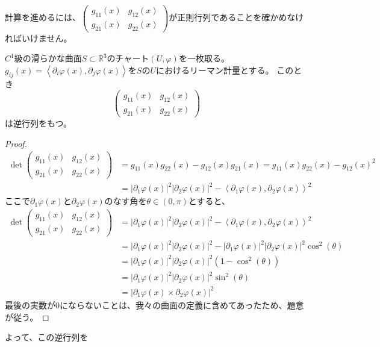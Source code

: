 計算を進めるには、$\begin{pmatrix}
  g_{11}(x)&g_{12}(x)\\
  g_{21}(x)&g_{22}(x)
\end{pmatrix}$が正則行列であることを確かめなければいけません。
\begin{lemma}
  $C^1$級の滑らかな曲面$S\subset\mathbb{R}^3$のチャート$(U,\varphi)$を一枚取る。
  $g_{ij}(x)=\left<\partial_i\varphi(x),\partial_j\varphi(x)\right>$を$S$の$U$におけるリーマン計量とする。
  このとき
  \[
    \begin{pmatrix}
      g_{11}(x) & g_{12}(x)\\
      g_{21}(x) & g_{22}(x)
    \end{pmatrix}
  \]
  は逆行列をもつ。
\end{lemma}
\begin{proof}
  \begin{align*}
    \det
    \begin{pmatrix}
      g_{11}(x) & g_{12}(x)\\
      g_{21}(x) & g_{22}(x)
    \end{pmatrix}
    &=g_{11}(x)g_{22}(x)-g_{12}(x)g_{21}(x)=g_{11}(x)g_{22}(x)-g_{12}(x)^2\\
    &=|\partial_1\varphi(x)|^2|\partial_2\varphi(x)|^2-\left<\partial_1\varphi(x),\partial_2\varphi(x)\right>^2
  \end{align*}
  ここで$\partial_1\varphi(x)$と$\partial_2\varphi(x)$のなす角を$\theta\in(0,\pi)$とすると、
  \begin{align*}
    \det
    \begin{pmatrix}
      g_{11}(x) & g_{12}(x)\\
      g_{21}(x) & g_{22}(x)
    \end{pmatrix}
    &=|\partial_1\varphi(x)|^2|\partial_2\varphi(x)|^2-\left<\partial_1\varphi(x),\partial_2\varphi(x)\right>^2\\
    &=|\partial_1\varphi(x)|^2|\partial_2\varphi(x)|^2-|\partial_1\varphi(x)|^2|\partial_2\varphi(x)|^2\cos^2(\theta)\\
    &=|\partial_1\varphi(x)|^2|\partial_2\varphi(x)|^2(1-\cos^2(\theta))\\
    &=|\partial_1\varphi(x)|^2|\partial_2\varphi(x)|^2\sin^2(\theta)\\
    &=|\partial_1\varphi(x)\times\partial_2\varphi(x)|^2
  \end{align*}
  最後の実数が0にならないことは、我々の曲面の定義に含めてあったため、題意が従う。
\end{proof}
よって、この逆行列を
